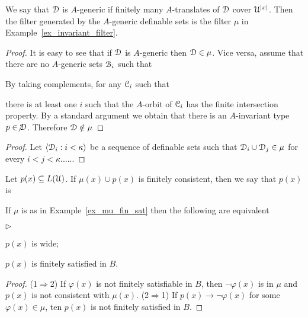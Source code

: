 \documentclass{amsproc}
\newcommand{\mylabel}[1]{{#1}\hfill}
\renewenvironment{itemize}
  {\begin{list}{$\triangleright$}{%
  \setlength{\parskip}{0mm}
  \setlength{\topsep}{.4\baselineskip}
  \setlength{\rightmargin}{0mm}
  \setlength{\listparindent}{0mm}
  \setlength{\itemindent}{0mm}
  \setlength{\labelwidth}{3ex}
  \setlength{\itemsep}{.2\baselineskip}
  \setlength{\parsep}{.2\baselineskip}
  \setlength{\partopsep}{0mm}
  \setlength{\labelsep}{1ex}
  \setlength{\leftmargin}{\labelwidth+\labelsep}
  \let\makelabel\mylabel}}{%
\end{list}}
\renewcommand*{\emph}[1]{%
   \smash{\tikz[baseline]\node[rectangle, fill=teal!25, rounded corners, inner xsep=0.5ex, inner ysep=0.2ex, anchor=base, minimum height = 2.7ex]{\strut #1};}}
\begin{document}
\begin{example}
  We say that $\EuScript D$ is $A$-generic if finitely many $A$-translates of $\EuScript D$ cover $\EuScript U^{|x|}$.
  Then the filter generated by the $A$-generic definable sets is the filter $\mu$ in Example~\ref{ex_invariant_filter}.
\end{example}
  
\begin{proof}
  It is easy to see that if $\EuScript D$ is $A$-generic then $\EuScript D\in\mu$.
  Vice versa, assume that there are no $A$-generic sets  $\EuScript B_i$ such that 


  By taking complements, for any $\EuScript C_i$ such that 
  

  there is at least one $i$ such that the $A$-orbit of $\EuScript C_i$ has the finite intersection property.
  By a standard argument we obtain that there is an $A$-invariant type $p\in\not\EuScript D$.
  Therefore $\EuScript D\notin\mu$
\end{proof}

\begin{proof}
  Let $\langle\EuScript D_i:i<\kappa\rangle$ be a sequence of definable sets such that $\EuScript D_i\cup \EuScript D_j\in\mu$ for every $i<j<\kappa$......
\end{proof}

\begin{definition}
  Let $p(x)\subseteq L(\EuScript U)$.
  If $\mu(x)\cup p(x)$ is finitely consistent, then we say that $p(x)$ is \emph{wide.}
\end{definition}

\begin{example}
  If $\mu$ is as in Example~\ref{ex_mu_fin_sat} then the following are equivalent
  \begin{itemize}
    \item[1.] $p(x)$ is wide;
    \item[2.] $p(x)$ is finitely satisfied in $B$.
  \end{itemize}
\end{example}

\begin{proof}
  (1$\Rightarrow$2) If $\varphi(x)$ is not finitely satisfiable in $B$, then $\neg\varphi(x)$ is in $\mu$ and $p(x)$ is not consistent with $\mu(x)$.
  (2$\Rightarrow$1) If $p(x)\rightarrow\neg\varphi(x)$ for some $\varphi(x)\in\mu$, ten $p(x)$ is not finitely satisfied in $B$.
\end{proof}
\end{document}

